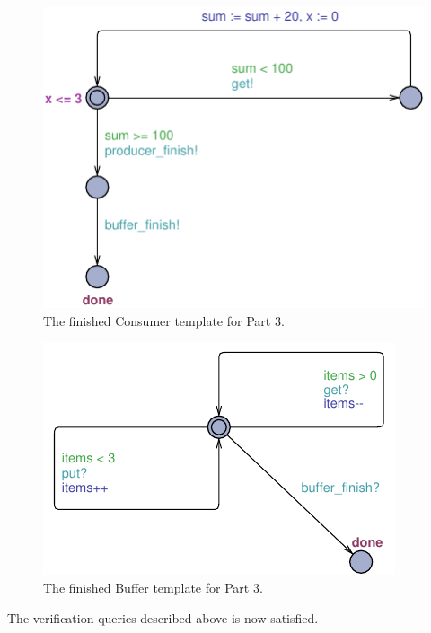 \documentclass[a4paper,10pt]{article}
\begin{document}
\begin{figure}[h]
  \center
  \includegraphics{Part3ConsumerFixed.pdf}
  \caption{The finished Consumer template for Part 3.}
  \label{img:part3consumerFixed}
\end{figure}

\begin{figure}[h]
  \center
  \includegraphics{Part3BufferFixed.pdf}
  \caption{The finished Buffer template for Part 3.}
  \label{img:part3bufferFixed}
\end{figure}

The verification queries described above is now satisfied.
\end{document}
